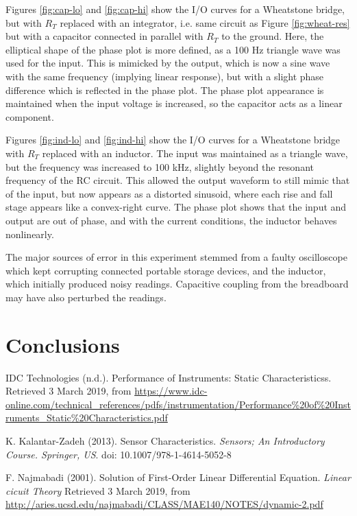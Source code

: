 \documentclass[12pt,a4paper,twoside]{article}
\begin{document}
Figures \ref{fig:cap-lo} and \ref{fig:cap-hi} show the I/O curves for a Wheatstone bridge, but with $R_T$ replaced with an integrator, i.e. same circuit as Figure \ref{fig:wheat-res} but with a capacitor connected in parallel with $R_T$ to the ground. Here, the elliptical shape of the phase plot is more defined, as a 100 Hz triangle wave was used for the input. This is mimicked by the output, which is now a sine wave with the same frequency (implying linear response), but with a slight phase difference which is reflected in the phase plot. The phase plot appearance is maintained when the input voltage is increased, so the capacitor acts as a linear component.

Figures \ref{fig:ind-lo} and \ref{fig:ind-hi} show the I/O curves for a Wheatstone bridge with $R_T$ replaced with an inductor. The input was maintained as a triangle wave, but the frequency was increased to 100 kHz, slightly beyond the resonant frequency of the RC circuit. This allowed the output waveform to still mimic that of the input, but now appears as a distorted sinusoid, where each rise and fall stage appears like a convex-right curve. The phase plot shows that the input and output are out of phase, and with the current conditions, the inductor behaves nonlinearly.

The major sources of error in this experiment stemmed from a faulty oscilloscope which kept corrupting connected portable storage devices, and the inductor, which initially produced noisy readings. Capacitive coupling from the breadboard may have also perturbed the readings.

\section{Conclusions}
\label{sec:Conc}
\medskip
\clearpage


\begin{thebibliography}{1}
\label{sec:Ref}

IDC Technologies (n.d.). Performance of Instruments: Static Characteristicss. Retrieved 3 March 2019, from \url{https://www.idc-online.com/technical_references/pdfs/instrumentation/Performance\%20of\%20Instruments_Static\%20Characteristics.pdf}


K. Kalantar-Zadeh (2013). Sensor Characteristics. \textit{Sensors; An Introductory Course. Springer, US}.  
doi: 10.1007/978-1-4614-5052-8

F. Najmabadi (2001). Solution of First-Order Linear Differential Equation. \textit{Linear cicuit Theory}
Retrieved 3 March 2019, from \url{http://aries.ucsd.edu/najmabadi/CLASS/MAE140/NOTES/dynamic-2.pdf}

\end{thebibliography}
\end{document}

